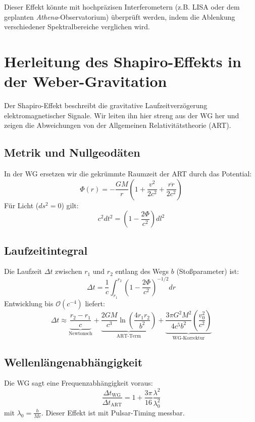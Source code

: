 Dieser Effekt könnte mit hochpräzisen Interferometern (z.B. LISA oder dem geplanten \textit{Athena}-Observatorium) überprüft werden, indem die Ablenkung verschiedener
Spektralbereiche verglichen wird.

\section{Herleitung des Shapiro-Effekts in der Weber-Gravitation}
\label{sec:shapiro_effect_wg_dbt}

Der Shapiro-Effekt beschreibt die gravitative Laufzeitverzögerung elektromagnetischer Signale. Wir leiten ihn hier streng aus der WG her und zeigen die Abweichungen von der Allgemeinen Relativitätstheorie (ART).

\subsection{Metrik und Nullgeodäten}
In der WG ersetzen wir die gekrümmte Raumzeit der ART durch das Potential:
\begin{equation}
\Phi(r) = -\frac{GM}{r}\left(1 + \frac{v^2}{2c^2} + \frac{r\ddot{r}}{2c^2}\right)
\end{equation}
Für Licht ($ds^2 = 0$) gilt:
\begin{equation}
c^2dt^2 = \left(1 - \frac{2\Phi}{c^2}\right)dl^2
\end{equation}

\subsection{Laufzeitintegral}
Die Laufzeit $\Delta t$ zwischen $r_1$ und $r_2$ entlang des Wegs $b$ (Stoßparameter) ist:
\begin{equation}
\Delta t = \frac{1}{c}\int_{r_1}^{r_2} \left(1 - \frac{2\Phi}{c^2}\right)^{-1/2} dr
\end{equation}
Entwicklung bis $\mathcal{O}(c^{-4})$ liefert:
\begin{equation}
\Delta t \approx \underbrace{\frac{r_2 - r_1}{c}}_{\text{Newtonsch}} + \underbrace{\frac{2GM}{c^3}\ln\left(\frac{4r_1r_2}{b^2}\right)}_{\text{ART-Term}} + \underbrace{\frac{3\pi G^2M^2}{4c^5b^2}\left(\frac{v_0^2}{c^2}\right)}_{\text{WG-Korrektur}}
\end{equation}

\subsection{Wellenlängenabhängigkeit}
Die WG sagt eine Frequenzabhängigkeit voraus:
\begin{equation}
\frac{\Delta t_{\text{WG}}}{\Delta t_{\text{ART}}} = 1 + \frac{3\pi}{16}\frac{\lambda^2}{\lambda_0^2}
\end{equation}
mit $\lambda_0 = \frac{h}{Mc}$. Dieser Effekt ist mit Pulsar-Timing messbar.

